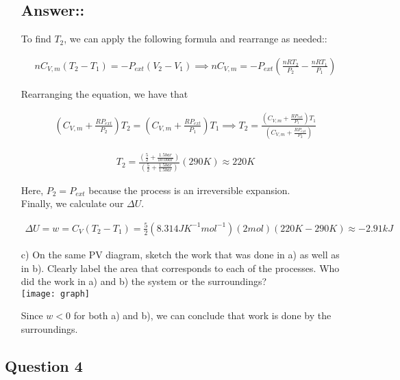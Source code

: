 \documentclass[12pt]{book}
\begin{document}
\begin{itemize}
    \subsection*{Answer::}

    To find $T_2$, we can apply the following formula and rearrange as needed::

    \begin{align*}
        nC_{V,m}(T_2-T_1)=-P_{ext}(V_2-V_1)\implies nC_{V,m}=-P_{ext}\left(\frac{nRT_2}{P_2}-\frac{nRT_1}{P_1}\right)
    \end{align*}

    Rearranging the equation, we have that

    \begin{align*}
        \left(C_{V,m}+\frac{RP_{ext}}{P_2}\right)T_2=\left(C_{V,m}+\frac{RP_{ext}}{P_1}\right)T_1\implies T_2=\frac{\left(C_{V,m}+\frac{RP_{ext}}{P_1}\right)T_1}{\left(C_{V,m}+\frac{RP_{ext}}{P_2}\right)}
    \end{align*}

    \begin{align*}
        T_2=\frac{\left(\frac{5}{2}+\frac{1.5bar}{10.0bar}\right)}{\left(\frac{5}{2}+\frac{1.5bar}{1.5bar}\right)}(290K)\approx 220K
    \end{align*}

    Here, $P_2=P_{ext}$ because the process is an irreversible expansion.\\Finally, we calculate our $\Delta U$.

    \begin{align*}
        \Delta U=w=C_V(T_2-T_1)=\frac{5}{2}(8.314 JK^{-1}mol^{-1})(2mol)(220K-290K)\approx -2.91 kJ
    \end{align*}

    \item[c)] On the same PV diagram, sketch the work that was done in a) as well as in b). Clearly label the area that corresponds to each of the processes. Who did the work in a) and b) the system or the surroundings?\\
    \texttt{[image: graph]}

    Since $w<0$ for both a) and b), we can conclude that work is done by the surroundings.
    
\end{itemize}

\subsection*{Question 4}
\end{document}
